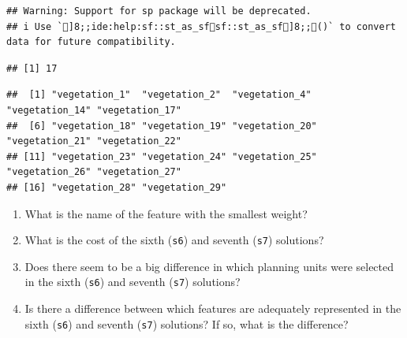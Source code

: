 \documentclass[
  12pt,
]{book}
\makeatletter
\newenvironment{Shaded}{\begin{snugshade}}{\end{snugshade}}
\newcommand{\AttributeTok}[1]{\textcolor[rgb]{0.77,0.63,0.00}{#1}}
\newcommand{\CommentTok}[1]{\textcolor[rgb]{0.56,0.35,0.01}{\textit{#1}}}
\newcommand{\ConstantTok}[1]{\textcolor[rgb]{0.00,0.00,0.00}{#1}}
\newcommand{\FloatTok}[1]{\textcolor[rgb]{0.00,0.00,0.81}{#1}}
\newcommand{\FunctionTok}[1]{\textcolor[rgb]{0.00,0.00,0.00}{#1}}
\newcommand{\NormalTok}[1]{#1}
\newcommand{\SpecialCharTok}[1]{\textcolor[rgb]{0.00,0.00,0.00}{#1}}
\providecommand{\tightlist}{%
  \setlength{\itemsep}{0pt}\setlength{\parskip}{0pt}}
\newenvironment{kframe}{%
\medskip{}
\setlength{\fboxsep}{.8em}
 \def\at@end@of@kframe{}%
 \ifinner\ifhmode%
  \def\at@end@of@kframe{\end{minipage}}%
  \begin{minipage}{\columnwidth}%
 \fi\fi%
 \def\FrameCommand##1{\hskip\@totalleftmargin \hskip-\fboxsep
 \colorbox{shadecolor}{##1}\hskip-\fboxsep
     \hskip-\linewidth \hskip-\@totalleftmargin \hskip\columnwidth}%
 \MakeFramed {\advance\hsize-\width
   \@totalleftmargin\z@ \linewidth\hsize
   \@setminipage}}%
 {\par\unskip\endMakeFramed%
 \at@end@of@kframe}
\newenvironment{rmdblock}[1]
  {
  \begin{itemize}
  \renewcommand{\labelitemi}{
    \raisebox{-.7\height}[0pt][0pt]{
      {\setkeys{Gin}{width=3em,keepaspectratio}\texttt{[image: images/\#1]}}
    }
  }
  \setlength{\fboxsep}{1em}
  \begin{kframe}
  \item
  }
  {
  \end{kframe}
  \end{itemize}
  }
\newenvironment{rmdquestion}
  {\begin{rmdblock}{question}}
  {\end{rmdblock}}
\makeatother
\begin{document}
\begin{verbatim}
## Warning: Support for sp package will be deprecated.
## i Use `]8;;ide:help:sf::st_as_sfsf::st_as_sf]8;;()` to convert data for future compatibility.
\end{verbatim}

\begin{Shaded}
\end{Shaded}

\begin{verbatim}
## [1] 17
\end{verbatim}

\begin{Shaded}
\end{Shaded}

\begin{verbatim}
##  [1] "vegetation_1"  "vegetation_2"  "vegetation_4"  "vegetation_14" "vegetation_17"
##  [6] "vegetation_18" "vegetation_19" "vegetation_20" "vegetation_21" "vegetation_22"
## [11] "vegetation_23" "vegetation_24" "vegetation_25" "vegetation_26" "vegetation_27"
## [16] "vegetation_28" "vegetation_29"
\end{verbatim}

\begin{rmdquestion}
\begin{enumerate}
\def\labelenumi{\arabic{enumi}.}
\tightlist
\item
  What is the name of the feature with the smallest weight?
\item
  What is the cost of the sixth (\texttt{s6}) and seventh (\texttt{s7}) solutions?
\item
  Does there seem to be a big difference in which planning units were selected in the sixth (\texttt{s6}) and seventh (\texttt{s7}) solutions?
\item
  Is there a difference between which features are adequately represented in the sixth (\texttt{s6}) and seventh (\texttt{s7}) solutions? If so, what is the difference?
\end{enumerate}
\end{rmdquestion}
\end{document}
